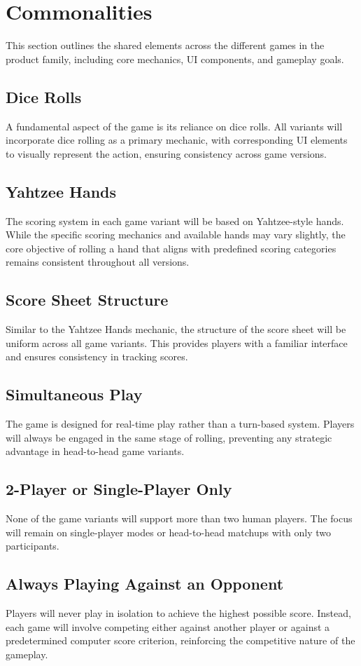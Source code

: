 \section{Commonalities}

This section outlines the shared elements across the different games in the product family, including core mechanics, UI components, and gameplay goals.

\subsection{Dice Rolls}
A fundamental aspect of the game is its reliance on dice rolls. All variants will incorporate dice rolling as a primary mechanic, with corresponding UI elements to visually represent the action, ensuring consistency across game versions.

\subsection{Yahtzee Hands}
The scoring system in each game variant will be based on Yahtzee-style hands. While the specific scoring mechanics and available hands may vary slightly, the core objective of rolling a hand that aligns with predefined scoring categories remains consistent throughout all versions.

\subsection{Score Sheet Structure}
Similar to the Yahtzee Hands mechanic, the structure of the score sheet will be uniform across all game variants. This provides players with a familiar interface and ensures consistency in tracking scores.

\subsection{Simultaneous Play}
The game is designed for real-time play rather than a turn-based system. Players will always be engaged in the same stage of rolling, preventing any strategic advantage in head-to-head game variants.

\subsection{2-Player or Single-Player Only}
None of the game variants will support more than two human players. The focus will remain on single-player modes or head-to-head matchups with only two participants.

\subsection{Always Playing Against an Opponent}
Players will never play in isolation to achieve the highest possible score. Instead, each game will involve competing either against another player or against a predetermined computer score criterion, reinforcing the competitive nature of the gameplay.
